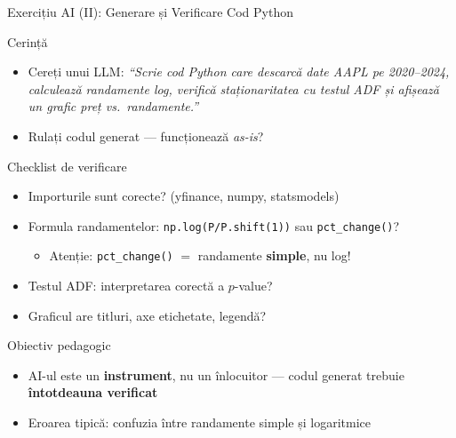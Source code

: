 \documentclass[9pt, aspectratio=169, t]{beamer}
\begin{document}
\begin{frame}[fragile, shrink=3]{Exercițiu AI (II): Generare și Verificare Cod Python}
\begin{block}{Cerință}
\begin{itemize}\setlength{\itemsep}{0pt}
    \item Cereți unui LLM: \textit{``Scrie cod Python care descarcă date AAPL pe 2020--2024, calculează randamente log, verifică staționaritatea cu testul ADF și afișează un grafic preț vs.\ randamente.''}
    \item Rulați codul generat --- funcționează \textit{as-is}?
\end{itemize}
\end{block}
\vspace{0.1cm}
\begin{alertblock}{Checklist de verificare}
\begin{itemize}\setlength{\itemsep}{0pt}
    \item Importurile sunt corecte? (yfinance, numpy, statsmodels)
    \item Formula randamentelor: \texttt{np.log(P/P.shift(1))} sau \texttt{pct\_change()}?
    \begin{itemize}\setlength{\itemsep}{0pt}
        \item Atenție: \texttt{pct\_change()} $=$ randamente \textbf{simple}, nu log!
    \end{itemize}
    \item Testul ADF: interpretarea corectă a $p$-value?
    \item Graficul are titluri, axe etichetate, legendă?
\end{itemize}
\end{alertblock}
\vspace{0.1cm}
\begin{exampleblock}{Obiectiv pedagogic}
\begin{itemize}\setlength{\itemsep}{0pt}
    \item AI-ul este un \textbf{instrument}, nu un înlocuitor --- codul generat trebuie \textbf{întotdeauna verificat}
    \item Eroarea tipică: confuzia între randamente simple și logaritmice
\end{itemize}
\end{exampleblock}
\end{frame}
\end{document}
